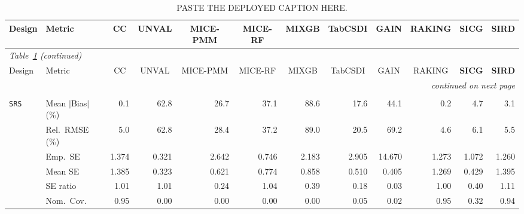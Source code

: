 \begin{landscape}
\footnotesize\setlength{\tabcolsep}{3.5pt}
\begin{longtable}{llrrrrrrrrrr}
\caption{PASTE THE DEPLOYED CAPTION HERE.}
\label{tab:appc_nutri_Gaussian} \\
\toprule
Design & Metric & \multicolumn{1}{c}{CC} & \multicolumn{1}{c}{UNVAL} & \multicolumn{1}{c}{MICE-PMM} & \multicolumn{1}{c}{MICE-RF} & \multicolumn{1}{c}{MIXGB} & \multicolumn{1}{c}{TabCSDI} & \multicolumn{1}{c}{GAIN} & \multicolumn{1}{c}{RAKING} & \multicolumn{1}{c}{\textbf{SICG}} & \multicolumn{1}{c}{\textbf{SIRD}} \\
\midrule \endfirsthead
\multicolumn{12}{l}{\footnotesize\itshape Table~\ref{tab:appc_nutri_Gaussian} (continued)} \\
\toprule
Design & Metric & \multicolumn{1}{c}{CC} & \multicolumn{1}{c}{UNVAL} & \multicolumn{1}{c}{MICE-PMM} & \multicolumn{1}{c}{MICE-RF} & \multicolumn{1}{c}{MIXGB} & \multicolumn{1}{c}{TabCSDI} & \multicolumn{1}{c}{GAIN} & \multicolumn{1}{c}{RAKING} & \multicolumn{1}{c}{\textbf{SICG}} & \multicolumn{1}{c}{\textbf{SIRD}} \\
\midrule \endhead
\midrule \multicolumn{12}{r}{\footnotesize\itshape continued on next page} \\
\endfoot
\bottomrule \endlastfoot
\multicolumn{12}{l}{\textbf{Continuous Phase-Two Covariates}} \\
\addlinespace[2pt]
\quad \texttt{SRS} & Mean $|$Bias$|$ (\%) & \cellcolor{rankone}0.1 & 62.8 & 26.7 & 37.1 & 88.6 & 17.6 & 44.1 & \cellcolor{ranktwo}0.2 & 4.7 & \cellcolor{rankthree}3.1 \\
 & Rel.\ RMSE (\%) & \cellcolor{ranktwo}5.0 & 62.8 & 28.4 & 37.2 & 89.0 & 20.5 & 69.2 & \cellcolor{rankone}4.6 & 6.1 & \cellcolor{rankthree}5.5 \\
 & Emp.\ SE & 1.374 & 0.321 & 2.642 & 0.746 & 2.183 & 2.905 & 14.670 & 1.273 & 1.072 & 1.260 \\
 & Mean SE & 1.385 & 0.323 & 0.621 & 0.774 & 0.858 & 0.510 & 0.405 & 1.269 & 0.429 & 1.395 \\
 & SE ratio & \cellcolor{rankthree}1.01 & \cellcolor{ranktwo}1.01 & 0.24 & 1.04 & 0.39 & 0.18 & 0.03 & \cellcolor{rankone}1.00 & 0.40 & 1.11 \\
 & Nom.\ Cov. & \cellcolor{rankone}0.95 & 0.00 & 0.00 & 0.00 & 0.00 & 0.05 & 0.02 & \cellcolor{ranktwo}0.95 & 0.32 & \cellcolor{rankthree}0.94 \\

\end{longtable}
\end{landscape}
